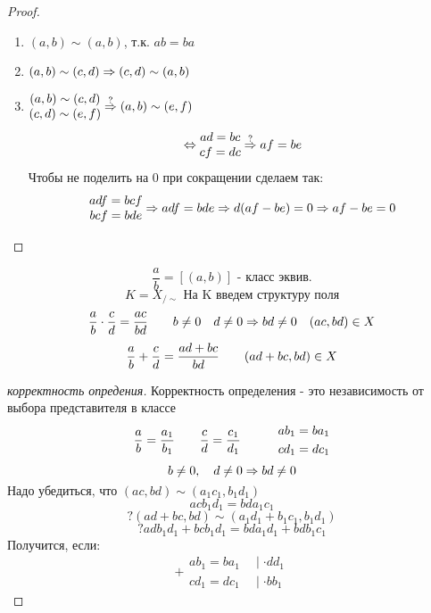 \documentclass[12pt, fleqn]{article}
\begin{document}
\begin{Proof}
    \begin{proof}
        \begin{enumerate}
          \item $(a, b) \sim (a, b)$, т.к. $ab = ba$
          \item $(a, b) \sim (c, d) \Rightarrow (c, d) \sim (a, b)$
          \item $\begin{matrix}
              (a, b) \sim (c, d)\\
              (c, d) \sim (e, f)
          \end{matrix}
          \overset{?}{\Rightarrow} (a, b) \sim (e, f)$
          \[\Leftrightarrow \begin{matrix}
            ad = bc\\
            cf = dc
          \end{matrix}
          \overset{?}{\Rightarrow} af = be\]
          Чтобы не поделить на 0 при сокращении сделаем так:
          \[\begin{matrix}
            adf = bcf \\
            bcf = bde
          \end{matrix}
          \Rightarrow adf = bde \Rightarrow d(af - be) = 0 \Rightarrow af - be = 0\]
        \end{enumerate}
    \end{proof}

    \begin{Definition}
        \[\frac{a}{b} = [(a, b)] \text{ - класс эквив.} \]
        \[K = X_{/\sim} \text{ На K введем структуру поля}\]
        \[\frac{a}{b} \cdot \frac{c}{d} = \frac{ac}{bd} \quad \quad b \neq 0 \quad d \neq 0 \Rightarrow bd \neq 0 \quad (ac, bd) \in X\]
        \[\frac{a}{b} + \frac{c}{d} = \frac{ad + bc}{bd} \quad\quad (ad + bc, bd) \in X\]
    \end{Definition}

    \begin{proof}[корректность опредения]
       Корректность определения - это независимость от выбора представителя в классе
        \[\frac{a}{b} = \frac{a_1}{b_1} \quad\quad \frac{c}{d} = \frac{c_1}{d_1} \quad\quad\quad
        \begin{align}
            ab_1 = ba_1\\
            cd_1 = dc_1
        \end{align}\]
        \[b \neq 0, \quad d \neq 0 \Rightarrow bd \neq 0\]
        $\text{Надо убедиться, что }(ac, bd) \sim (a_1 c_1, b_1 d_1)$
        \[a c b_1 d_1 = bd a_1 c_1\]
        \[? (ad + bc, bd) \sim (a_1 d_1 + b_1 c_1, b_1 d_1)\]
        \[? ad b_1 d_1 + bc b_1 d_1 = bd a_1 d_1 + bd b_1 c_1\]
        Получится, если:
        \[+ \begin{align}
            ab_1 = ba_1 & \ \mid \cdot dd_1\\
            cd_1 = dc_1 & \ \mid \cdot bb_1
        \end{align}\]
    \end{proof}


\end{Proof}
\end{document}

